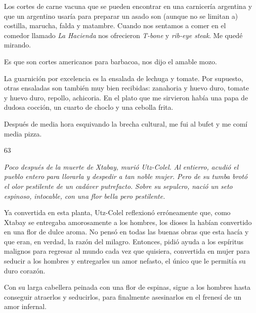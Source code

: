 \documentclass[12pt,twoside,openright,a5paper]{book}
\begin{document}
\nopagebreak

\vspace{0.5cm}

\nopagebreak

Los cortes de carne vacuna que se pueden encontrar en una carnicería
argentina y que un argentino usaría para preparar un asado son (aunque
no se limitan a) costilla, marucha, falda y matambre. Cuando nos sentamos
a comer en el comedor llamado \emph{La Hacienda} nos ofrecieron \emph{T-bone} y \emph{rib-eye
steak}. Me quedé mirando.

Es que son cortes americanos para barbacoa, nos dijo el amable mozo.

La guarnición por excelencia es la ensalada de lechuga y tomate. Por
supuesto, otras ensaladas son también muy bien recibidas: zanahoria y huevo
duro, tomate y huevo duro, repollo, achicoria. En el plato que me sirvieron
había una papa de dudosa cocción, un cuarto de choclo y una cebolla frita.

Después de media hora esquivando la brecha cultural, me fui al bufet y me
comí media pizza.

\vspace{0.5cm}

\hrulefill \hspace{0.1cm}\decofourleft\hspace{0.2cm} 63 \hspace{0.2cm}\decofourright \hspace{0.1cm}\hrulefill

\nopagebreak

\vspace{0.5cm}

\nopagebreak

{\em Poco después de la muerte de Xtabay, murió Utz-Colel. Al entierro,
acudió el pueblo entero para llorarla y despedir a tan noble mujer. Pero de su
tumba brotó el olor pestilente de un cadáver putrefacto.
Sobre su sepulcro, nació un seto espinoso, intocable, con una flor bella pero pestilente.

Ya convertida en esta planta, Utz-Colel reflexionó erróneamente que, como
Xtabay se entregaba amorosamente a los hombres, los dioses la habían
convertido en una flor de dulce aroma. No pensó en todas las buenas obras
que esta hacía y que eran, en verdad, la razón del milagro. Entonces, pidió
ayuda a los espíritus malignos para  regresar al mundo cada vez que quisiera,
convertida en mujer para seducir a los hombres y entregarles un amor nefasto,
el único que le permitía su duro corazón. 

Con su larga cabellera peinada con
una flor de espinas, sigue a los hombres hasta conseguir atraerlos
y seducirlos, para finalmente asesinarlos en el frenesí de un amor infernal.}
\end{document}
